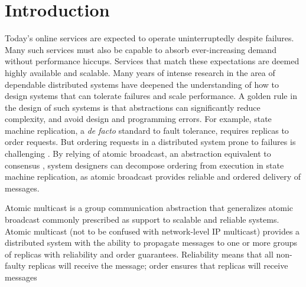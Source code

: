 \section{Introduction}
\label{sec:introduction}

Today's online services are expected to operate uninterruptedly despite failures.
Many such services must also be capable to absorb ever-increasing demand without performance hiccups.
Services that match these expectations are deemed highly available and scalable.
Many years of intense research in the area of dependable distributed systems have deepened the understanding of how to design systems that can tolerate failures and scale performance.
A golden rule in the design of such systems is that abstractions can significantly reduce complexity, and avoid design and programming errors.
For example, state machine replication, a \emph{de facto} standard to fault tolerance, requires replicas to order requests.
But ordering requests in a distributed system prone to failures is challenging \cite{FLP85}.
By relying of atomic broadcast, an abstraction equivalent to consensus \cite{HT93,CT96}, system designers can decompose ordering from execution in state machine replication, as atomic broadcast provides reliable and ordered delivery of messages.

Atomic multicast is a group communication abstraction that generalizes atomic broadcast
commonly prescribed as support to scalable and reliable systems.
Atomic multicast (not to be confused with network-level IP multicast) provides a distributed system with the ability to propagate messages to one or more groups of replicas with reliability and order guarantees.
Reliability means that all non-faulty replicas will receive the message; order ensures that replicas will receive messages 


